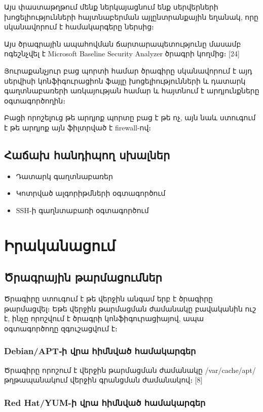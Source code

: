 \documentclass[11pt]{article}
\begin{document}
\begin{sloppypar}
Այս փաստաթղթում մենք ներկայացնում ենք սերվերների խոցելիությունների
հայտնաբերման այլընտրանքային եղանակ, որը սկանավորում է համակարգերը
ներսից։

Այս ծրագրային ապահովման ճարտարապետությունը մասամբ ոգեշնչվել է
Microsoft Baseline Security Analyzer ծրագրի կողմից։ [24]

Յուրաքանչյուր բաց պորտի համար ծրագիրը սկանավորում է այդ սերվիսի
կոնֆիգուրացիոն ֆայլը խոցելիությունների և դատարկ գաղտնաբառերի
առկայության համար և հայտնում է արդյունքները օգտագործողին։

Բացի որոշելուց թե արդյոք պորտը բաց է թե ոչ, այն նաև ստուգում է
թե արդյոք այն ֆիլտրված է firewall-ով։


\subsection{Հաճախ հանդիպող սխալներ}

\begin{itemize}
\item Դատարկ գաղտնաբառեր
\item Կոտրված ալգորիթմների օգտագործում
\item SSH-ի գաղնտաբառի օգտագործում
\end{itemize}


\section{Իրականացում}


\subsection{Ծրագրային թարմացումներ}

Ծրագիրը ստուգում է թե վերջին անգամ երբ է ծրագիրը թարմացվել։
Եթե վերջին թարմացման ժամանակը բավականին ուշ է, ինչը
որոշվում է ծրագրի կոնֆիգուրացիայով, ապա օգտագործողը
զգուշացվում է։


\subsubsection{Debian/APT֊ի վրա հիմնված համակարգեր}

Ծրագիրը որոշում է վերջին թարմացման ժամանակը /var/cache/apt/
թղթապանակում վերջին գրանցման ժամանակով։ [8]

\subsubsection{Red Hat/YUM-ի վրա հիմնված համակարգեր}


\end{sloppypar}
\end{document}
